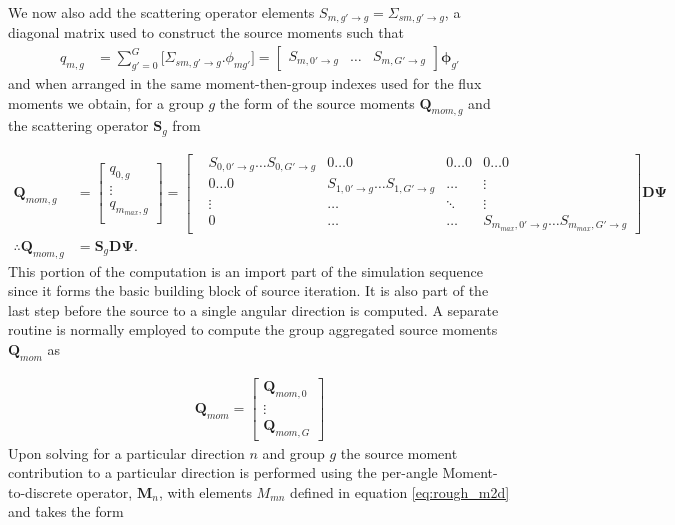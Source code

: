 \documentclass[11pt,letterpaper,titlepage]{article}
\numberwithin{equation}{section}
\begin{document}
We now also add the scattering operator elements $S_{m,g'{\to}g}=\Sigma_{sm,g'{\to}g}$, a diagonal matrix used to construct the source moments such that
\begin{align}
q_{m,g}&=
\sum_{g'=0}^{G}
\biggr[
\Sigma_{sm,g'{\to}g} 
. \phi_{mg'}
\biggr] 
= 
\begin{bmatrix}
S_{m,0'{\to}g} &\hdots &S_{m,G'{\to}g}
\end{bmatrix} \boldsymbol{\phi}_{g'} 
\end{align}
and when arranged in the same moment-then-group indexes used for the flux moments we obtain, for a group $g$ the form of the source moments $\mathbf{Q}_{mom,g}$ and the scattering operator $\mathbf{S}_g$ from

\begin{equation}
\begin{aligned}
\mathbf{Q}_{mom,g}&=
\begin{bmatrix}
q_{0,g} \\ 
\vdots \\
q_{m_{max},g} \\
\end{bmatrix}
=
\begin{bmatrix}
&S_{0,0'{\to}g} \hdots S_{0,G'{\to}g} 
&0\hdots 0 
&0\hdots 0 
&0\hdots 0\\
&0 \hdots 0  
&S_{1,0'{\to}g} \hdots S_{1,G'{\to}g}
&\hdots 
&\vdots \\
&\vdots 
&\hdots 
&\ddots 
&\vdots \\
&0 
&\hdots 
&\hdots
&S_{m_{max},0'{\to}g} \hdots S_{m_{max},G'{\to}g}
\end{bmatrix}
\mathbf{D}\mathbf{\Psi} \\
\therefore
\mathbf{Q}_{mom,g}
&=
\mathbf{S}_g\mathbf{D}\mathbf{\Psi}.
\end{aligned}
\end{equation}
\newline
This portion of the computation is an import part of the simulation sequence since it forms the basic building block of source iteration. It is also part of the last step before the source to a single angular direction is computed. A separate routine is normally employed to compute the group aggregated source moments $\mathbf{Q}_{mom}$ as

\begin{align}
\mathbf{Q}_{mom} = 
\begin{bmatrix}
\mathbf{Q}_{mom,0} \\
\vdots \\
\mathbf{Q}_{mom,G}
\end{bmatrix}
\end{align}
\newline
Upon solving for a particular direction $n$ and group $g$ the source moment contribution to a particular direction is performed using the per-angle Moment-to-discrete operator, $\mathbf{M}_n$, with elements $M_{mn}$ defined in equation \ref{eq:rough_m2d} and takes the form 
\end{document}
